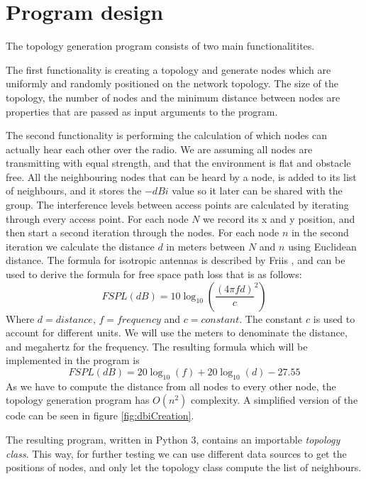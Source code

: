 	\section{Program design}\label{prog_design}
	The topology generation program consists of two main functionalitites.

	The first functionality is creating a topology and generate nodes which are uniformly
	and randomly positioned on the network topology. The size of the topology, the number of nodes and the minimum distance
	between nodes are properties that are passed as input arguments to the program.

	The second functionality is performing the calculation of which nodes can actually hear each other over the radio.
	We are assuming all nodes	are transmitting with equal strength, and that the environment is flat and obstacle free. 
	All the neighbouring nodes that can be heard by a node, is added to its list of neighbours, and it stores the $-dBi$ value so it later can be shared with
	the group. The interference levels between access points are calculated by iterating through every access point. For each node $N$ we record its x and y position,
	and then start a second iteration through the nodes. For each node $n$ in the second iteration we calculate the distance $d$ in
	meters between $N$ and $n$ using Euclidean distance. The formula for isotropic antennas is described by Friis \cite{Friis46}, and can be used to
	derive the formula for free space path loss \cite{FSPL} that is as follows:
\[
	FSPL(dB) = 10\log_{10} \left( \frac{ (4 \pi f d)}{c} ^2 \right) 
\]	
	Where $d = distance$, $f = frequency$ and $c=constant$. The constant $c$ is used to account for different units. We will use the meters to denominate the distance,
	and megahertz for the frequency. The resulting formula which will be implemented in the program is
\[
	FSPL(dB) = 20\log_{10}\left( f \right)  + 20\log_{10} \left(d\right) - 27.55
\]	
	As we have to compute the distance from all nodes to every other node, the topology generation program has $O(n^2)$ complexity. A simplified version of the code
	can be seen in figure \ref{fig:dbiCreation}. 

	The resulting program, written in Python 3\cite{Python3}, contains an importable \textit{topology class}. This way, for further testing we can use different data
	sources to get the positions of nodes, and only let the topology class compute the list of neighbours. 
	

